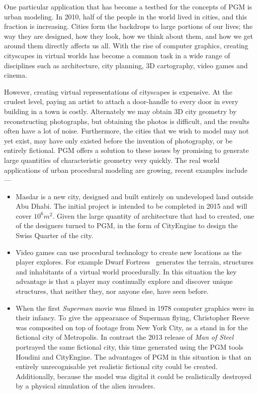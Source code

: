 One particular application that has become a testbed for the concepts of PGM is urban modeling. In 2010, half of the people in the world lived in cities, and this fraction is increasing. Cities form the backdrops to large portions of our lives; the way they are designed, how they look, how we think about them, and how we get around them directly affects us all. With the rise of computer graphics, creating cityscapes in virtual worlds has become a common task in a wide range of disciplines such as architecture, city planning, 3D cartography, video games and cinema. 

However, creating virtual representations of cityscapes is expensive. At the crudest level, paying an artist to attach a door-handle to every door in every building in a town is costly. Alternately we may obtain 3D city geometry by reconstructing photographs, but obtaining the photos is difficult, and the results often have a lot of noise. Furthermore, the cities that we wish to model may not yet exist, may have only existed before the invention of photography, or be entirely fictional. PGM offers a solution to these issues by promising to generate large quantities of characteristic geometry very quickly. The real world applications of urban procedural modeling are growing, recent examples include ---

\begin{itemize}
\item{Masdar is a new city, designed and built entirely on undeveloped land outside Abu Dhabi. The initial project is intended to be completed in 2015 and will cover $10^6 m^2$\cite{masdarCity2}. Given the large quantity of architecture that had to created, one of the designers turned to PGM, in the form of CityEngine\cite{cityEngine} to design the Swiss Quarter of the city\cite{masdarCity}.}

\item{Video games can use procedural technology to create new locations as the player explores. For example Dwarf Fortress~\cite{dwarfFortress} generates the terrain, structures and inhabitants of a virtual world procedurally. In this situation the key advantage is that a player may continually explore and discover unique structures, that neither they, nor anyone else, have seen before. }

\item{When the first \emph{Superman} movie was filmed in 1978 computer graphics were in their infancy. To give the appearance of Superman flying, Christopher Reeve was composited on top of footage from New York City, as a stand in for the fictional city of Metropolis. In contrast the 2013 release of \emph{Man of Steel} portrayed the same fictional city, this time generated using the PGM tools Houdini\cite{houdini} and CityEngine\cite{EffectsOmelette}. The advantages of PGM in this situation is that an entirely unrecognisable yet realistic fictional city could be created. Additionally, because the model was digital it could be realistically destroyed by a physical simulation of the alien invaders.}

\end{itemize}

